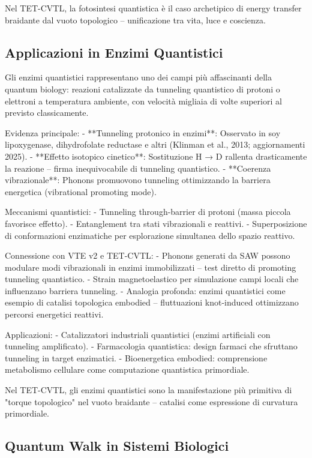 \documentclass[11pt,a4paper]{article}
\begin{document}
Nel TET-CVTL, la fotosintesi quantistica è il caso archetipico di energy transfer braidante dal vuoto topologico – unificazione tra vita, luce e coscienza.

\subsection{Applicazioni in Enzimi Quantistici}

Gli enzimi quantistici rappresentano uno dei campi più affascinanti della quantum biology: reazioni catalizzate da tunneling quantistico di protoni o elettroni a temperatura ambiente, con velocità migliaia di volte superiori al previsto classicamente.

Evidenza principale:
- **Tunneling protonico in enzimi**: Osservato in soy lipoxygenase, dihydrofolate reductase e altri (Klinman et al., 2013; aggiornamenti 2025).
- **Effetto isotopico cinetico**: Sostituzione H → D rallenta drasticamente la reazione – firma inequivocabile di tunneling quantistico.
- **Coerenza vibrazionale**: Phonons promuovono tunneling ottimizzando la barriera energetica (vibrational promoting mode).

Meccanismi quantistici:
- Tunneling through-barrier di protoni (massa piccola favorisce effetto).
- Entanglement tra stati vibrazionali e reattivi.
- Superposizione di conformazioni enzimatiche per esplorazione simultanea dello spazio reattivo.

Connessione con VTE v2 e TET-CVTL:
- Phonons generati da SAW possono modulare modi vibrazionali in enzimi immobilizzati – test diretto di promoting tunneling quantistico.
- Strain magnetoelastico per simulazione campi locali che influenzano barriera tunneling.
- Analogia profonda: enzimi quantistici come esempio di catalisi topologica embodied – fluttuazioni knot-induced ottimizzano percorsi energetici reattivi.

Applicazioni:
- Catalizzatori industriali quantistici (enzimi artificiali con tunneling amplificato).
- Farmacologia quantistica: design farmaci che sfruttano tunneling in target enzimatici.
- Bioenergetica embodied: comprensione metabolismo cellulare come computazione quantistica primordiale.

Nel TET-CVTL, gli enzimi quantistici sono la manifestazione più primitiva di "torque topologico" nel vuoto braidante – catalisi come espressione di curvatura primordiale.


\subsection{Quantum Walk in Sistemi Biologici}
\end{document}

